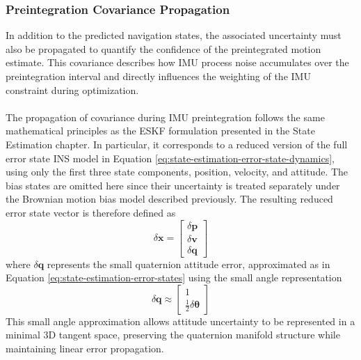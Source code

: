 \subsubsection{Preintegration Covariance Propagation}
In addition to the predicted navigation states, the associated uncertainty must also be propagated to quantify the confidence of the preintegrated motion estimate. This covariance describes how IMU process noise accumulates over the preintegration interval and directly influences the weighting of the IMU constraint during optimization.  
\\ \\
The propagation of covariance during IMU preintegration follows the same mathematical principles as the ESKF formulation presented in the State Estimation chapter. In particular, it corresponds to a reduced version of the full error state INS model in Equation \ref{eq:state-estimation-error-state-dynamics}, using only the first three state components, position, velocity, and attitude. The bias states are omitted here since their uncertainty is treated separately under the Brownian motion bias model described previously. The resulting reduced error state vector is therefore defined as
$$
    \delta \mathbf{x} =
    \begin{bmatrix}
        \delta \mathbf{p} \\
        \delta \mathbf{v} \\
        \delta \mathbf{q}
    \end{bmatrix}
$$
where $\delta\mathbf{q}$ represents the small quaternion attitude error, approximated as in Equation \ref{eq:state-estimation-error-states} using the small angle representation
$$
    \delta\mathbf{q} \approx
    \begin{bmatrix}
        1 \\
        \tfrac{1}{2}\delta\boldsymbol{\theta}
    \end{bmatrix}
$$
This small angle approximation allows attitude uncertainty to be represented in a minimal 3D tangent space, preserving the quaternion manifold structure while maintaining linear error propagation.
